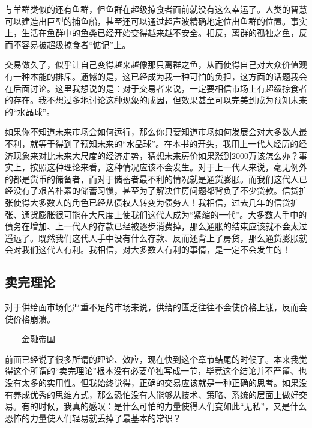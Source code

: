 与羊群类似的还有鱼群，但鱼群在超级掠食者面前就没有这么幸运了。人类的智慧可以建造出巨型的捕鱼船，甚至还可以通过超声波精确地定位出鱼群的位置。事实上，生活在鱼群中的鱼类已经开始变得越来越不安全。相反，离群的孤独之鱼，反而不容易被超级掠食者“惦记”上。

交易做久了，似乎让自己变得越来越像那只离群之鱼，从而使得自己对大众价值观有一种本能的排斥。遗憾的是，这已经成为我一种可怕的负担，这方面的话题我会在后面讨论。这里我想说的是：对于交易者来说，一定要相信市场上有超级掠食者的存在。我不想过多地讨论这种现象的成因，但效果甚至可以完美到成为预知未来的“水晶球”。

如果你不知道未来市场会如何运行，那么你只要知道市场如何发展会对大多数人最不利，就等于得到了预知未来的“水晶球”。在本书的开头，我用上一代人经历的经济现象来对比未来大尺度的经济走势，猜想未来房价如果涨到2000万该怎么办？事实上，按照这种理论来看，这种情况应该不会发生。对于上一代人来说，毫无例外的都是货币的储备者，而对于储蓄者最不利的情况就是通货膨胀。而我们这代人已经没有了艰苦朴素的储蓄习惯，甚至为了解决住房问题都背负了不少贷款。信贷扩张使得大多数人的角色已经从债权人转变为债务人！我相信，过去几年的信贷扩张、通货膨胀很可能在大尺度上使我们这代人成为“紧缩的一代”。大多数人手中的债务在增加、上一代人的存款已经被逐步消费掉，那么通胀的结束应该就不会太过遥远了。既然我们这代人手中没有什么存款、反而还背上了房贷，那么通货膨胀就会对我们这代人有利。我相信，对大多数人有利的事情，是一定不会发生的！

\subsection{卖完理论}

{\kaishu
对于供给面市场化严重不足的市场来说，供给的匮乏往往不会使价格上涨，反而会使价格崩溃。

\hfill ——金融帝国
}

前面已经说了很多所谓的理论、效应，现在快到这个章节结尾的时候了。本来我觉得这个所谓的“卖完理论”根本没有必要单独写成一节，毕竟这个结论并不严谨、也没有太多的实用性。但我始终觉得，正确的交易应该就是一种正确的思考。如果没有养成优秀的思维方式，那么恐怕没有人能够从技术、策略、系统的层面上做好交易。有的时候，我真的感叹：是什么可怕的力量使得人们变如此“无私”，又是什么恐怖的力量使人们轻易就丢掉了最基本的常识？


